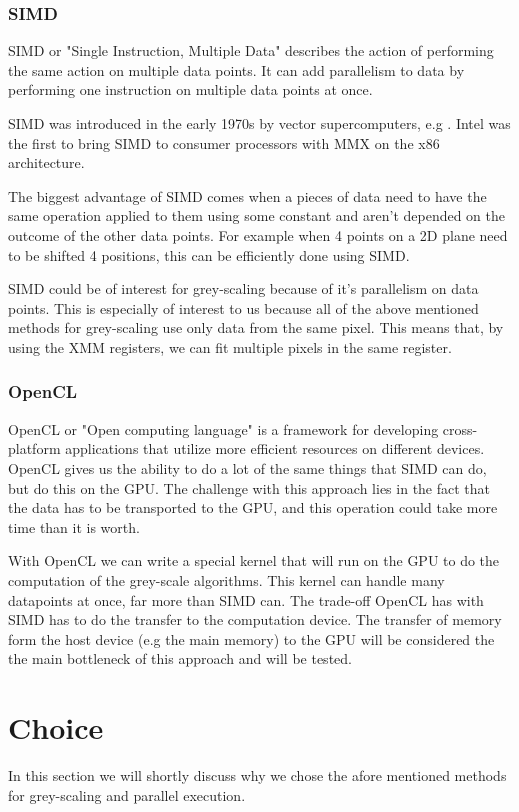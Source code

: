 \documentclass[a4paper]{article}
\begin{document}
\subsubsection{SIMD}
SIMD or "Single Instruction, Multiple Data" describes the action of performing the same action on multiple data points. It can add parallelism to data by performing one instruction on multiple data points at once.

SIMD was introduced in the early 1970s by vector supercomputers, e.g \cite{TI-ASC}.
Intel was the first to bring SIMD to consumer processors with MMX\cite{INTEL-MMX} on the x86 architecture.

The biggest advantage of SIMD comes when a pieces of data need to have the same operation applied to them using some constant and aren't depended on the outcome of the other data points. For example when 4 points on a 2D plane need to be shifted 4 positions, this can be efficiently done using SIMD.

SIMD could be of interest for grey-scaling because of it's parallelism on data points. This is especially of interest to us because all of the above mentioned methods for grey-scaling use only data from the same pixel. This means that, by using the XMM registers, we can fit multiple pixels in the same register.

\subsubsection{OpenCL}
OpenCL\cite{OPENCL} or "Open computing language" is a framework for developing cross-platform applications that utilize more efficient resources on different devices. OpenCL gives us the ability to do a lot of the same things that SIMD can do, but do this on the GPU. The challenge with this approach lies in the fact that the data has to be transported to the GPU, and this operation could take more time than it is worth.

With OpenCL we can write a special kernel that will run on the GPU to do the computation of the grey-scale algorithms. This kernel can handle many datapoints at once, far more than SIMD can. The trade-off OpenCL has with SIMD has to do the transfer to the computation device. The transfer of memory form the host device (e.g the main memory) to the GPU will be considered the the main bottleneck of this approach and will be tested.

\section{Choice}
In this section we will shortly discuss why we chose the afore mentioned methods for grey-scaling and parallel execution.
\end{document}
